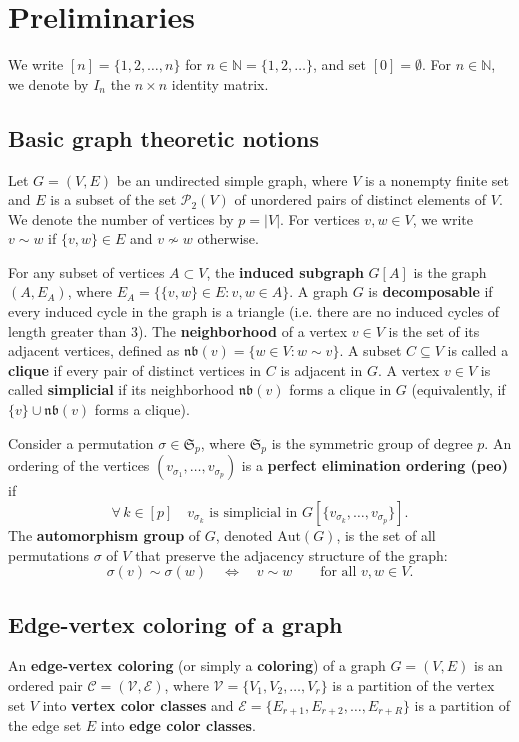 \documentclass[12pt]{amsart}
\theoremstyle{plain}
\theoremstyle{definition}
\theoremstyle{remark}
\newcommand{\1}{\mathbf{1}}
\def\nb{{\mathfrak{nb}}}
\begin{document}
\section{Preliminaries}\label{sec:preli}

We write $[n]=\{1,2,\ldots,n\}$ for $n\in\mathbb{N}=\{1,2,\ldots\}$, and set $[0]=\emptyset$. For $n\in\mathbb{N}$, we denote by $I_n$ the $n\times n$ identity matrix.

\subsection{Basic graph theoretic notions}\label{sec:basics}

Let \(G=(V,E)\) be an undirected simple graph, where \(V\) is a nonempty finite set and \(E\) is a subset of the set $\mathcal{P}_2(V)$ of unordered pairs of distinct elements of $V$. We denote the number of vertices by \(p=|V|\). For vertices $v,w\in V$, we write \(v\sim w\) if \(\{v,w\}\in E\) and $v\nsim w$ otherwise.

For any subset of vertices \(A\subset V\), the \textbf{induced subgraph} \(G[A]\) is the graph \((A,E_A)\), where $E_A = \{ \{v,w\}\in E\colon v,w\in A\}$.
A graph $G$ is \textbf{decomposable} if every induced cycle in the graph is a triangle (i.e. there are no induced cycles of length greater than 3). The \textbf{neighborhood} of a vertex $v\in V$ is the set of its adjacent vertices, defined as \(\nb(v)=\{w\in V\colon w\sim v\}\).
A subset $C\subseteq V$ is called a \textbf{clique} if every pair of distinct vertices in $C$ is adjacent in $G$.
A vertex $v\in V$ is called \textbf{simplicial} if its neighborhood \(\nb(v)\) forms a clique in $G$ (equivalently, if $\{v\}\cup\nb(v)$ forms a clique). 

Consider a permutation $\sigma\in\mathfrak{S}_p$, where $\mathfrak{S}_p$ is the symmetric group of degree $p$. An ordering of the vertices  $(v_{\sigma_1},\ldots,v_{\sigma_p})$ is a \textbf{perfect elimination ordering (peo)} if 
\[
\forall\, k\in[p]\quad v_{\sigma_k}\mbox{ is simplicial in }G[\{v_{\sigma_k},\ldots,v_{\sigma_p}\}].
\]
 The \textbf{automorphism group} of $G$, denoted $\mathrm{Aut}(G)$,  
is the set of all permutations 
$\sigma$ of $V$ that preserve the adjacency structure of the graph:
\[
\sigma(v) \sim \sigma(w)\quad\iff\quad v \sim w\qquad \mbox{for all } v, w \in V. 
\]



\subsection{Edge-vertex coloring of a graph}\label{sec:ev_colorings}
An \textbf{edge-vertex coloring} (or simply a \textbf{coloring}) of a graph \(G=(V,E)\) is an ordered pair $\mathcal{C} = (\mathcal{V}, \mathcal{E})$,
where $\mathcal{V} = \{V_1, V_2, \ldots, V_r\}$ is a partition of the vertex set $V$ into \textbf{vertex color classes} and 
$\mathcal{E} = \{E_{r+1}, E_{r+2}, \ldots, E_{r+R}\}$ is a partition of the edge set $E$ into \textbf{edge color classes}. 
\end{document}

